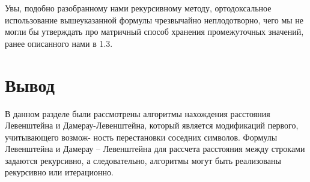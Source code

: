 Увы, подобно разобранному нами рекурсивному методу, ортодоксальное использование вышеуказанной формулы чрезвычайно неплодотворно, чего мы не могли бы утверждать про матричный способ хранения промежуточных значений, ранее описанного нами в 1.3. 

\section{Вывод}
В данном разделе были рассмотрены алгоритмы нахождения расстояния Левенштейна и Дамерау-Левенштейна, который является модификаций первого, учитывающего возмож- ность перестановки соседних символов. Формулы Левенштейна и Дамерау – Левенштейна для рассчета расстояния между строками задаются рекурсивно, а следовательно, алгоритмы могут быть реализованы рекурсивно или итерационно.